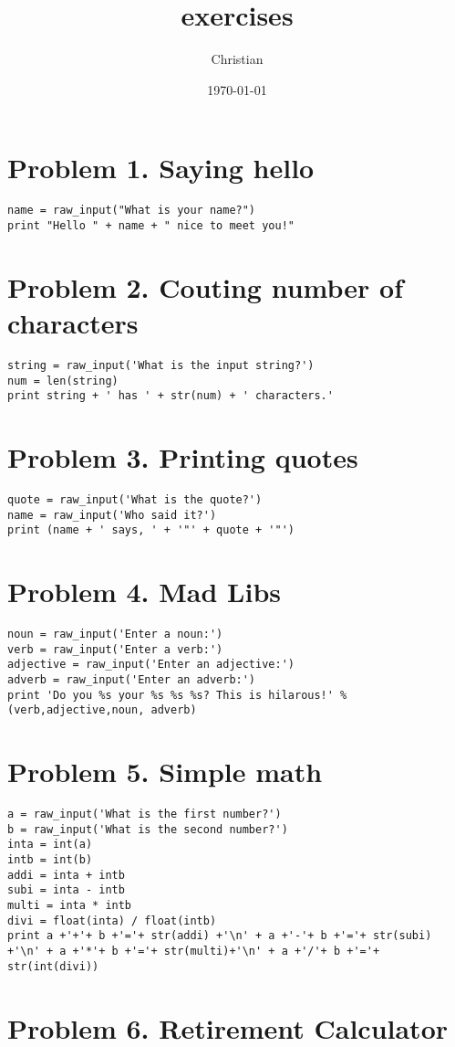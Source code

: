 \documentclass[11pt]{article}
\author{Christian}
\date{\today}
\title{exercises}
\begin{document}
\maketitle
\tableofcontents



\section{Problem 1. Saying hello}
\label{sec-1}
\begin{verbatim}
name = raw_input("What is your name?")
print "Hello " + name + " nice to meet you!"
\end{verbatim}

\section{Problem 2. Couting number of characters}
\label{sec-2}
\begin{verbatim}
string = raw_input('What is the input string?')
num = len(string)
print string + ' has ' + str(num) + ' characters.'
\end{verbatim}

\section{Problem 3. Printing quotes}
\label{sec-3}
\begin{verbatim}
quote = raw_input('What is the quote?')
name = raw_input('Who said it?')
print (name + ' says, ' + '"' + quote + '"')
\end{verbatim}
\section{Problem 4. Mad Libs}
\label{sec-4}
\begin{verbatim}
noun = raw_input('Enter a noun:')
verb = raw_input('Enter a verb:')
adjective = raw_input('Enter an adjective:')
adverb = raw_input('Enter an adverb:')
print 'Do you %s your %s %s %s? This is hilarous!' % (verb,adjective,noun, adverb)
\end{verbatim}
\section{Problem 5. Simple math}
\label{sec-5}
\begin{verbatim}
a = raw_input('What is the first number?')
b = raw_input('What is the second number?')
inta = int(a)
intb = int(b)
addi = inta + intb
subi = inta - intb
multi = inta * intb
divi = float(inta) / float(intb)
print a +'+'+ b +'='+ str(addi) +'\n' + a +'-'+ b +'='+ str(subi) +'\n' + a +'*'+ b +'='+ str(multi)+'\n' + a +'/'+ b +'='+ str(int(divi))
\end{verbatim}
\section{Problem 6. Retirement Calculator}
\label{sec-6}
\end{document}
